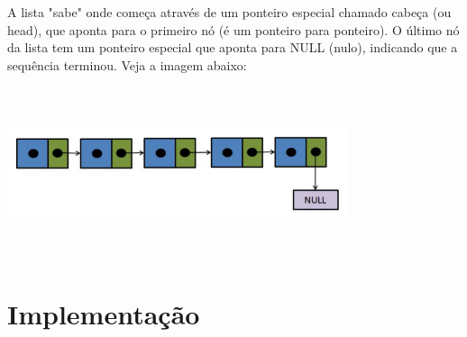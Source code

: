 \documentclass{report}
\begin{document}
	A lista "sabe" onde começa através de um ponteiro especial chamado cabeça (ou head), que aponta para o primeiro nó (é um ponteiro para ponteiro). O último nó da lista tem um ponteiro especial que aponta para NULL (nulo), indicando que a sequência terminou. Veja a imagem abaixo:
	
	\begin{center}
		
		\includegraphics[width=10cm,height=5cm,keepaspectratio=false]{imagens/lista_encadeada.png}
		
	\end{center}
	
	\section{Implementação}
	
\end{document}
